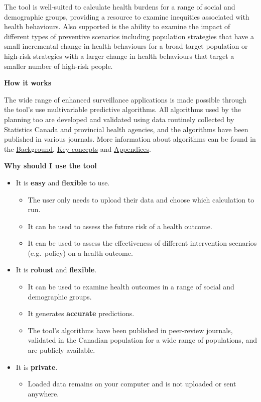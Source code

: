 \documentclass[]{book}
\providecommand{\tightlist}{%
  \setlength{\itemsep}{0pt}\setlength{\parskip}{0pt}}
\begin{document}
The tool is well-suited to calculate health burdens for a range of social and demographic groups, providing a resource to examine inequities associated with health behaviours.\citep{manuel2018} Also supported is the ability to examine the impact of different types of preventive scenarios including population strategies that have a small incremental change in health behaviours for a broad target population or high-risk strategies with a larger change in health behaviours that target a smaller number of high-risk people.\citep{PoRTover}

\textbf{How it works}

The wide range of enhanced surveillance applications is made possible through the tool's use multivariable predictive algorithms. All algorithms used by the planning too are developed and validated using data routinely collected by Statistics Canada and provincial health agencies, and the algorithms have been published in various journals. More information about algorithms can be found in the \protect\hyperlink{background}{Background}, \protect\hyperlink{keyconcepts}{Key concepts} and \protect\hyperlink{mport}{Appendices}.

\textbf{Why should I use the tool}

\begin{itemize}
\item
  It is \textbf{easy} and \textbf{flexible} to use.

  \begin{itemize}
  \tightlist
  \item
    The user only needs to upload their data and choose which calculation to run.
  \item
    It can be used to assess the future risk of a health outcome.
  \item
    It can be used to assess the effectiveness of different intervention scenarios (e.g.~policy) on a health outcome.
  \end{itemize}
\item
  It is \textbf{robust} and \textbf{flexible}.

  \begin{itemize}
  \tightlist
  \item
    It can be used to examine health outcomes in a range of social and demographic groups.
  \item
    It generates \textbf{accurate} predictions.
  \item
    The tool's algorithms have been published in peer-review journals, validated in the Canadian population for a wide range of populations, and are publicly available.
  \end{itemize}
\item
  It is \textbf{private}.

  \begin{itemize}
  \tightlist
  \item
    Loaded data remains on your computer and is not uploaded or sent anywhere.
  \end{itemize}
\end{itemize}
\end{document}

